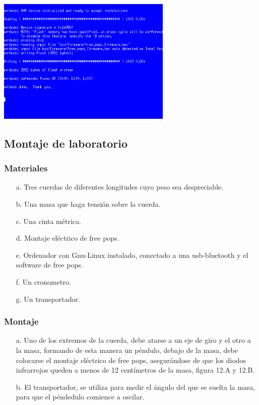 \documentclass[12pt]{article}
\newenvironment{Figure}
{\par\medskip\noindent\minipage{\linewidth}}
{\endminipage\par\medskip}
\begin{document}
\begin{multicols}{2}
\begin{Figure}
\center
\includegraphics[width=8.cm, height=6cm]{fig/micro.png}
\label{fig:g11}
\end{Figure}
\vspace{0.2cm}
  
\subsection{Montaje de laboratorio}
\subsubsection{Materiales}
\begin{enumerate}
\item[a. ] Tres cuerdas de diferentes longitudes cuyo peso sea despreciable.
\item[b. ] Una masa que haga tensión sobre la cuerda.
\item[c. ] Una cinta métrica.
\item[d. ] Montaje eléctrico de free pops.
\item[e. ] Ordenador con Gnu-Linux instalado, conectado a una usb-bluetooth y el software de free pops.
\item[f. ] Un cronometro. 
\item[g. ] Un transportador. 
\end{enumerate}

\subsubsection{Montaje}

\begin{enumerate}
\item[a. ] Uno de los extremos de la cuerda, debe atarse a un eje de giro y el otro a la masa, formando de esta manera un péndulo,  debajo de la masa, debe colocarse el montaje eléctrico de free pops, asegurándose de que los diodos infrarrojos queden a menos de 12  centímetros  de la masa, figura 12.A y 12.B.
\item[b. ] El transportador, se  utiliza para medir el ángulo del que se suelta la masa, para que el péndedulo comience a oscilar.
\end{enumerate}


\end{multicols}
\end{document}
